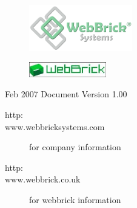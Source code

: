 \documentclass[a4paper,12pt]{article}
\title{\sf{Datasheet for Infra Red Receiver}}
\author{Andy Harris}
\begin{document}
\maketitle

\begin{figure}[H]
\centering
\includegraphics[width=0.4\textwidth]{Images/WebBrickSystems.png}
\end{figure}

\begin{figure}[H]
\centering
\includegraphics[width=0.3\textwidth]{Images/wb_logo.jpg}
\end{figure}


\begin{description}
\item[Feb 2007 Document Version 1.00]
\end{description}

\begin{description}
\item[http:\\www.webbricksystems.com] for company information
\item[http:\\www.webbrick.co.uk] for webbrick information
\end{description}

\pagebreak


\end{document}
